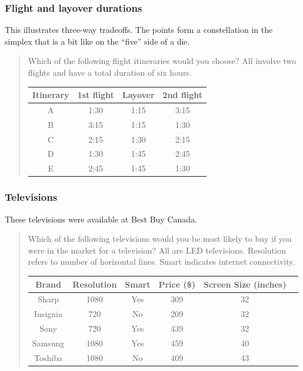 \documentclass[11pt,letter]{amsart}
\begin{document}
\subsubsection{Flight and layover durations}

This illustrates three-way tradeoffs. The points form a constellation in the
simplex that is a bit like on the ``five'' side of a die.

\begin{quotation}
Which of the following flight itineraries would you choose? All involve two
flights and have a total duration of six hours.

\begin{tabular}{cccc}
\hline
Itinerary & 1st flight & Layover & 2nd flight \\ \hline
A & 1:30 & 1:15 & 3:15 \\ 
B & 3:15 & 1:15 & 1:30 \\ 
C & 2:15 & 1:30 & 2:15 \\ 
D & 1:30 & 1:45 & 2:45 \\ 
E & 2:45 & 1:45 & 1:30 \\ \hline
\end{tabular}
\end{quotation}

\subsubsection{Televisions}

These televisions were available at Best Buy Canada.

\begin{quotation}
Which of the following televisions would you be most likely to buy if you
were in the market for a television? All are LED televisions. Resolution
refers to number of horizontal lines. Smart indicates internet connectivity.

\begin{tabular}{cccccc}
\hline
Brand & Resolution & Smart & Price (\$) & Screen Size (inches) &  \\ \hline
Sharp & 1080 & Yes & 309 & 32 &  \\ 
Insignia & 720 & No & 209 & 32 &  \\ 
Sony & 720 & Yes & 439 & 32 &  \\ 
Samsung & 1080 & Yes & 459 & 40 &  \\ 
Toshiba & 1080 & No & 409 & 43 &  \\ \hline
\end{tabular}
\end{quotation}
\end{document}
